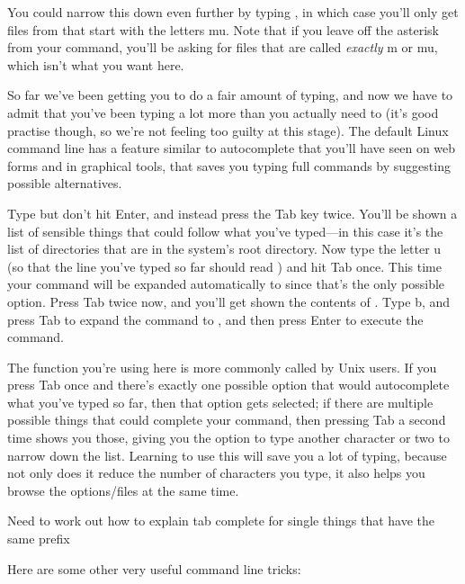 You could narrow this down even further by typing , in which case you'll only get files from  that start with the letters mu. Note that if you leave off the asterisk from your command, you'll be asking for files that are called \textit{exactly} m or mu, which isn't what you want here.

So far we've been getting you to do a fair amount of typing, and now we have to admit that you've been typing a lot more than you actually need to (it's good practise though, so we're not feeling too guilty at this stage). The default Linux command line has a feature similar to autocomplete that you'll have seen on web forms and in graphical tools, that saves you typing full commands by suggesting possible alternatives. 

Type  but don't hit Enter, and instead press the Tab key twice. You'll be shown a list of sensible things that could follow what you've typed---in this case it's the list of directories that are in the system's root directory. Now type the letter u (so that the line you've typed so far should read ) and hit Tab once. This time your command will be expanded automatically to  since that's the only possible option. Press Tab twice now, and you'll get shown the contents of . Type b, and press Tab to expand the command to , and then press Enter to execute the command.

The  function you're using here is more commonly called  by Unix users. If you press Tab once and there's exactly one possible option that would autocomplete what you've typed so far, then that option gets selected; if there are multiple possible things that could complete your command, then pressing Tab a second time shows you those, giving you the option to type another character or two to narrow down the list. Learning to use this will save you a lot of typing, because not only does it reduce the number of characters you type, it also helps you browse the options/files at the same time. 

\begin{note}
Need to work out how to explain tab complete for single things that have the same prefix
\end{note}


Here are some other very useful command line tricks:


